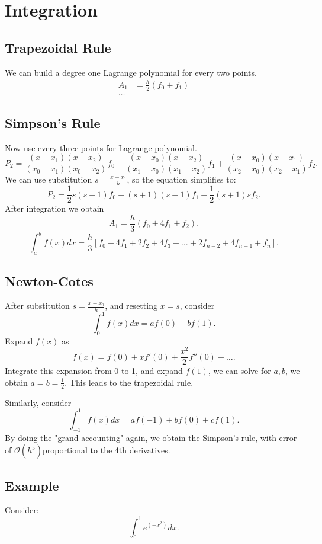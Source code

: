 \documentclass[class=article, crop=false]{standalone}
\theoremstyle{plain}
\theoremstyle{remark}
\begin{document}
\section{Integration}
\subsection{Trapezoidal Rule}
We can build a degree one Lagrange polynomial for every two points.
\begin{equation*}
\begin{split}
	A_1&=\frac{h}{2}(f_0+f_1)\\
	\ldots	
\end{split}
\end{equation*}
\subsection{Simpson's Rule}
Now use every three points for Lagrange polynomial.
\[
	P_2 = \frac{(x-x_1) (x-x_2) }{(x_0-x_1)(x_0-x_2) }f_0 + \frac{(x-x_0) (x-x_2) }{(x_1-x_0)(x_1-x_2) }f_1 + \frac{(x-x_0) (x-x_1) }{(x_2-x_0)(x_2-x_1) }f_2
.\] 
We can use substitution $s = \frac{x-x_1}{h}$, so the equation simplifies to:
 \[
	 P_2 = \frac{1}{2}s(s-1) f_0 - (s+1) (s-1) f_1 + \frac{1}{2}(s+1) s f_2
.\] 
After integration we obtain
\[
	A_1 = \frac{h}{3} (f_0+ 4 f_1 +f_2) 
.\]
\[
	\int_a^b f(x)dx = \frac{h}{3}[f_0+4f_1+2f_2+4f_3+\ldots+2 f_{n-2} + 4 f_{n-1} + f_n]
.\] 


\subsection{Newton-Cotes}
After substitution $s = \frac{x-x_0}{h}$, and resetting $x=s$, consider
\[
	\int_0^1 f(x)dx = a f(0)  + b f(1)  
.\] 
Expand $f(x) $ as 
\[
	f(x) =f(0) + x f'(0) + \frac{x^2}{2}f''(0) + \ldots 
.\]
Integrate this expansion from 0 to 1, and expand $f(1) $, we can solve for $a,b$, we obtain  $a=b=\frac{1}{2}$.
This leads to the trapezoidal rule.

Similarly, consider
\[
	\int_{-1}^1 f(x) dx=a f(-1) + b f(0) + c f(1)  
.\] 
By doing the "grand accounting" again, we obtain the Simpson's rule, with error of $\mathcal{O}(h^5) $proportional to the 4th derivatives.

\subsection{Example}
Consider:
\[
\int_0^1 e^{(-x^2)}dx
.\]
\end{document}

